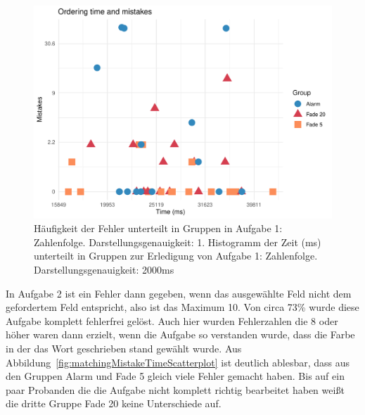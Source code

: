 \begin{figure}[H]
	\centering
	\includegraphics[width=\textwidth]{./_StudyResults/orderingMisTimeScat}
	\caption{Häufigkeit der Fehler unterteilt in Gruppen in Aufgabe 1: Zahlenfolge. Darstellungsgenauigkeit: 1. Histogramm der Zeit (ms) unterteilt in Gruppen zur Erledigung von Aufgabe 1: Zahlenfolge. Darstellungsgenauigkeit: 2000ms}
	\label{fig:orderingMistakeTimeScatterplot}
\end{figure}

In Aufgabe 2 ist ein Fehler dann gegeben, wenn das ausgewählte Feld nicht dem gefordertem Feld entspricht, also ist das Maximum 10.
Von circa 73\% wurde diese Aufgabe komplett fehlerfrei gelöst.
Auch hier wurden Fehlerzahlen die 8 oder höher waren dann erzielt, wenn die Aufgabe so verstanden wurde, dass die Farbe in der das Wort geschrieben stand gewählt wurde.
Aus Abbildung~\ref{fig:matchingMistakeTimeScatterplot} ist deutlich ablesbar, dass aus den Gruppen Alarm und Fade 5 gleich viele Fehler gemacht haben. Bis auf ein paar Probanden die die Aufgabe nicht komplett richtig bearbeitet haben weißt die dritte Gruppe Fade 20 keine Unterschiede auf.


